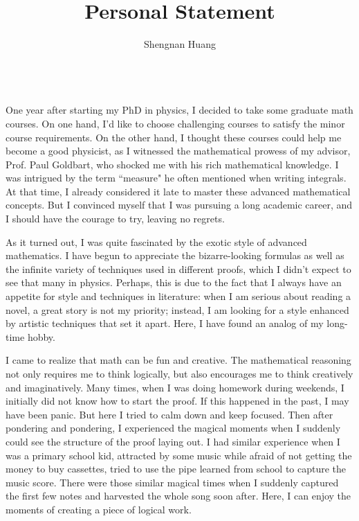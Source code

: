 \documentclass[nottitlepage]{article}
\begin{document}
\title{Personal Statement}
\author{Shengnan Huang\\
\\
}
\date{}
\maketitle
One year after starting my PhD in physics, I decided to take some graduate math courses. On one hand, I'd like to choose challenging courses to satisfy the minor course requirements. On the other hand, I thought these courses could help me become a good physicist, as I witnessed the mathematical prowess of my advisor, Prof. Paul Goldbart, who shocked me with his rich mathematical knowledge. I was intrigued by the term ``measure" he often mentioned when writing integrals. At that time, I already considered it late to master these advanced mathematical concepts. But I convinced myself that I was pursuing a long academic career, and I should have the courage to try, leaving no regrets.

As it turned out, I was quite fascinated by the exotic style of advanced mathematics. I have begun to appreciate the bizarre-looking formulas as well as the infinite variety of techniques used in different proofs, which I didn't expect to see that many in physics.  Perhaps, this is due to the fact that I always have an appetite for style and techniques in literature: when I am serious about reading a novel, a great story is not my priority; instead, I am looking for a style enhanced by artistic techniques that set it apart. Here, I have found an analog of my long-time hobby. 

I came to realize that math can be fun and creative. The mathematical reasoning not only requires me to think logically, but also encourages me to think creatively and imaginatively. Many times, when I was doing homework during weekends, I initially did not know how to start the proof. If this happened in the past, I may have been panic. But here I tried to calm down and keep focused. Then after pondering and pondering, I experienced the magical moments when I suddenly could see the structure of the proof laying out. I had similar experience when I was a primary school kid, attracted by some music while afraid of not getting the money to buy cassettes, tried to use the pipe learned from school to capture the music score. There were those similar magical times when I suddenly captured the first few notes and harvested the whole song soon after. Here, I can enjoy the moments of creating a piece of logical work.
\end{document}
